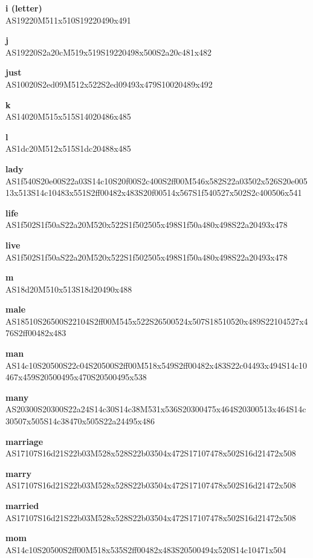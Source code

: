 \documentclass{article}
\begin{document}
\begin{glossary}
\textbf{i (letter)}\\
AS19220M511x510S19220490x491

\textbf{j}\\
AS19220S2a20cM519x519S19220498x500S2a20c481x482

\textbf{just}\\
AS10020S2ed09M512x522S2ed09493x479S10020489x492

\textbf{k}\\
AS14020M515x515S14020486x485

\textbf{l}\\
AS1dc20M512x515S1dc20488x485

\textbf{lady}\\
AS1f540S20e00S22a03S14c10S20f00S2c400S2ff00M546x582S22a03502x526S20e00513x513S14c10483x551S2ff00482x483S20f00514x567S1f540527x502S2c400506x541

\textbf{life}\\
AS1f502S1f50aS22a20M520x522S1f502505x498S1f50a480x498S22a20493x478

\textbf{live}\\
AS1f502S1f50aS22a20M520x522S1f502505x498S1f50a480x498S22a20493x478

\textbf{m}\\
AS18d20M510x513S18d20490x488

\textbf{male}\\
AS18510S26500S22104S2ff00M545x522S26500524x507S18510520x489S22104527x476S2ff00482x483

\textbf{man}\\
AS14c10S20500S22c04S20500S2ff00M518x549S2ff00482x483S22c04493x494S14c10467x459S20500495x470S20500495x538

\textbf{many}\\
AS20300S20300S22a24S14c30S14c38M531x536S20300475x464S20300513x464S14c30507x505S14c38470x505S22a24495x486

\textbf{marriage}\\
AS17107S16d21S22b03M528x528S22b03504x472S17107478x502S16d21472x508

\textbf{marry}\\
AS17107S16d21S22b03M528x528S22b03504x472S17107478x502S16d21472x508

\textbf{married}\\
AS17107S16d21S22b03M528x528S22b03504x472S17107478x502S16d21472x508

\textbf{mom}\\
AS14c10S20500S2ff00M518x535S2ff00482x483S20500494x520S14c10471x504


\end{glossary}
\end{document}
